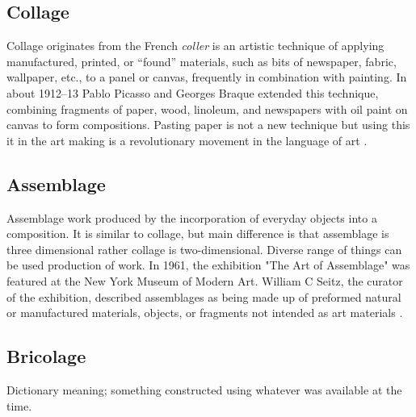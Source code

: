 \subsection{Collage}
Collage originates from the French \textit{coller} is an artistic technique of applying manufactured, printed, or “found” materials, such as bits of newspaper, fabric, wallpaper, etc., to a panel or canvas, frequently in combination with painting. In about 1912–13 Pablo Picasso and Georges Braque extended this technique, combining fragments of paper, wood, linoleum, and newspapers with oil paint on canvas to form compositions. Pasting paper is not a new technique but using this it in the art making is a revolutionary movement in the  language of art \cite{waldman1992collage}.


\cite{greenberg1984collage}

\subsection{Assemblage}
Assemblage work produced by the incorporation of everyday objects into a composition. It is similar to collage, but main difference is that assemblage is three dimensional rather collage is two-dimensional. Diverse range of things can be used production of work. In 1961, the exhibition "The Art of Assemblage" was featured at the New York Museum of Modern Art. William C Seitz, the curator of the exhibition, described assemblages as being made up of preformed natural or manufactured materials, objects, or fragments not intended as art materials \cite{seitz1961art}.


\subsection{Bricolage}
Dictionary meaning; something constructed using whatever was available at the time.



